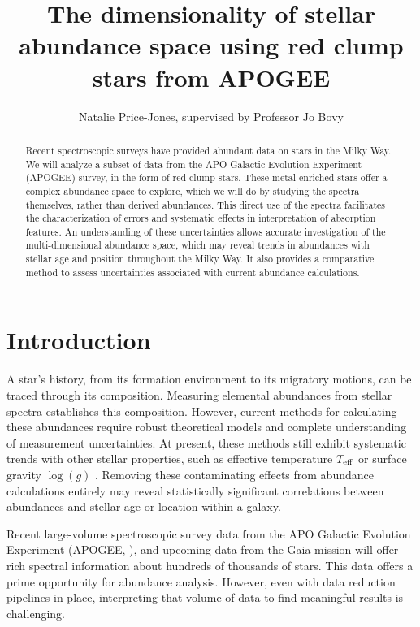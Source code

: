 \documentclass[preprint]{aastex}
\begin{document}
\title{The dimensionality of stellar abundance space using red clump stars from APOGEE}
\author{Natalie Price-Jones, supervised by Professor Jo Bovy}

\begin{abstract}
Recent spectroscopic surveys have provided abundant data on stars in the Milky Way. We will analyze a subset of data from the APO Galactic Evolution Experiment (APOGEE) survey, in the form of red clump stars. These metal-enriched stars offer a complex abundance space to explore, which we will do by studying the spectra themselves, rather than derived abundances. This direct use of the spectra facilitates the characterization of errors and systematic effects in interpretation of absorption features. An understanding of these uncertainties allows accurate investigation of the multi-dimensional abundance space, which may reveal trends in abundances with stellar age and position throughout the Milky Way. It also provides a comparative method to assess uncertainties associated with current abundance calculations.

\end{abstract}

\section{Introduction}
\label{sec:back}
A star's history, from its formation environment to its migratory motions, can be traced through its composition. Measuring elemental abundances from stellar spectra establishes this composition. However, current methods for calculating these abundances require robust theoretical models and complete understanding of measurement uncertainties. At present, these methods still exhibit systematic trends with other stellar properties, such as effective temperature $T_{\rm eff}$ or surface gravity $\log(g)$ \citep{holtzman2015}. Removing these contaminating effects from abundance calculations entirely may reveal statistically significant correlations between abundances and stellar age or location within a galaxy. 

Recent large-volume spectroscopic survey data from the APO Galactic Evolution Experiment (APOGEE, \citet{APOGEE}), and upcoming data from the Gaia mission \citep{GAIA} will offer rich spectral information about hundreds of thousands of stars. This data offers a prime opportunity for abundance analysis. However, even with data reduction pipelines in place, interpreting that volume of data to find meaningful results is challenging. 
\end{document}

